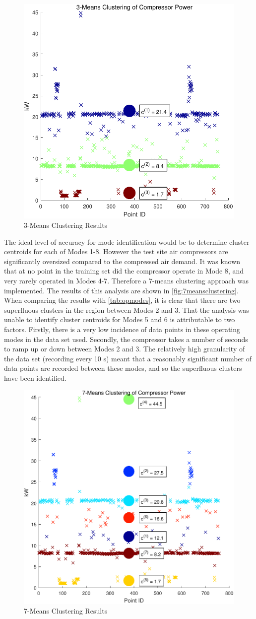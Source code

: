 \begin{figure}
\includegraphics[width = .5\columnwidth]{./Images/3MeansClustering.pdf}
\caption{3-Means Clustering Results}
\label{fig:3meansclustering}
\end{figure}

The ideal level of accuracy for mode identification would be to determine cluster centroids for each of Modes 1-8. However the test site air compressors are significantly oversized compared to the compressed air demand. It was known that at no point in the training set did the compressor operate in Mode 8, and very rarely operated in Modes 4-7. Therefore a 7-means clustering approach was implemented. The results of this analysis are shown in \autoref{fig:7meansclustering}. When comparing the results with \autoref{tab:opmodes}, it is clear that there are two superfluous clusters in the region between Modes 2 and 3. That the analysis was unable to identify cluster centroids for Modes 5 and 6 is attributable to two factors. Firstly, there is a very low incidence of data points in these operating modes in the data set used. Secondly, the compressor takes a number of seconds to ramp up or down between Modes 2 and 3. The relatively high granularity of the data set (recording every 10 s) meant that a reasonably significant number of data points are recorded between these modes, and so the superfluous clusters have been identified.

\begin{figure}
\includegraphics[width = .5\columnwidth]{./Images/7MeansClustering.pdf}
\caption{7-Means Clustering Results}
\label{fig:7meansclustering}
\end{figure}


